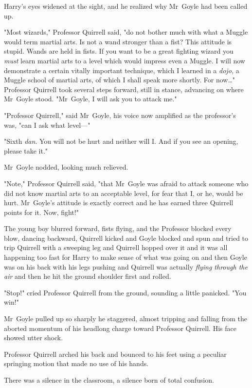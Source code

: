 Harry's eyes widened at the sight, and he realized why Mr~Goyle had been
called up.

"Most wizards," Professor Quirrell said, "do not bother much with what a Muggle
would term martial arts. Is not a wand stronger than a fist? This attitude is
stupid. Wands are held in fists. If you want to be a great fighting wizard you
\emph{must} learn martial arts to a level which would impress even a Muggle. I
will now demonstrate a certain vitally important technique, which I learned in
a \emph{dojo,} a Muggle school of martial arts, of which I shall speak more
shortly. For now{\ldots}" Professor Quirrell took several steps forward, still
in stance, advancing on where Mr~Goyle stood. "Mr~Goyle, I will ask you to
attack me."

"Professor Quirrell," said Mr~Goyle, his voice now amplified as the
professor's was, "can I ask what level---"

"Sixth \emph{dan}. You will not be hurt and neither will I\@. And if you see an
opening, please take it."

Mr~Goyle nodded, looking much relieved.

"Note," Professor Quirrell said, "that Mr~Goyle was afraid to attack someone
who did not know martial arts to an acceptable level, for fear that I, or he,
would be hurt. Mr~Goyle's attitude is exactly correct and he has earned three
Quirrell points for it. Now, fight!"

The young boy blurred forward, fists flying, and the Professor blocked every
blow, dancing backward, Quirrell kicked and Goyle blocked and spun and tried to
trip Quirrell with a sweeping leg and Quirrell hopped over it and it was all
happening too fast for Harry to make sense of what was going on and then Goyle
was on his back with his legs pushing and Quirrell was actually \emph{flying
through the air} and then he hit the ground shoulder first and rolled.

"Stop!" cried Professor Quirrell from the ground, sounding a little panicked.
"You win!"

Mr~Goyle pulled up so sharply he staggered, almost tripping and falling from
the aborted momentum of his headlong charge toward Professor Quirrell. His face
showed utter shock.

Professor Quirrell arched his back and bounced to his feet using a peculiar
springing motion that made no use of his hands.

There was a silence in the classroom, a silence born of total confusion.

